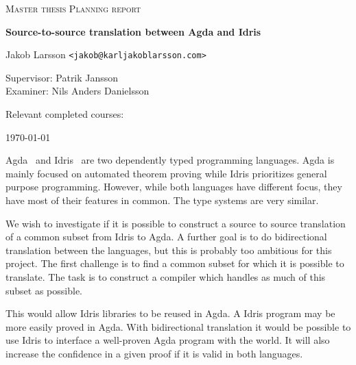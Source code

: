 \documentclass{scrartcl}
\begin{document}
\begin{titlepage}

\centering
{\scshape\LARGE Master thesis Planning report}

\vspace{0.5cm}
{\huge\bfseries Source-to-source translation between Agda and Idris
  }

\vspace{2cm}
{\Large Jakob Larsson \texttt{<jakob@karljakoblarsson.com>}}

\vspace{1.0cm}
{\large Supervisor: Patrik Jansson  \\
        Examiner: Nils Anders Danielsson}

\vspace{1.5cm}
{\large Relevant completed courses:}

\vfill
{\large \today}

\end{titlepage}


Agda~\cite{agda} and Idris~\cite{idris} are two dependently typed programming
languages.  Agda is mainly focused on automated theorem proving while Idris
prioritizes general purpose programming.  However, while both languages have
different focus, they have most of their features in common. The type systems
are very similar.

We wish to investigate if it is possible to construct a source to source
translation of a common subset from Idris to Agda.  A further goal is to do
bidirectional translation between the languages, but this is probably too
ambitious for this project.  The first challenge is to find a common subset for
which it is possible to translate. The task is to construct a compiler which
handles as much of this subset as possible.



This would allow Idris libraries to be reused in Agda. A Idris program may be
more easily proved in Agda. With bidirectional translation it would be possible
to use Idris to interface a well-proven Agda program with the world.  It will
also increase the confidence in a given proof if it is valid in both languages.
\end{document}
